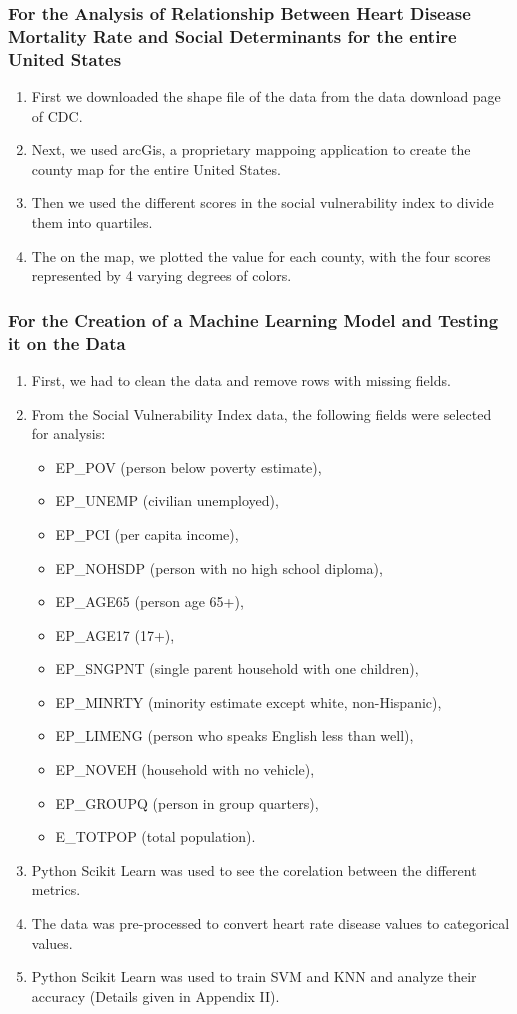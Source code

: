 \documentclass[journal,12pt,onecolumn]{IEEEtran}
\begin{document}
\subsubsection{For the Analysis of Relationship Between Heart Disease Mortality Rate and Social Determinants for the entire United States}
\begin{enumerate}
\item First we downloaded the shape file of the data from the data download page of CDC.
\item Next, we used arcGis, a proprietary mappoing application to create the county map for the entire United States.
\item Then we used the different scores in the social vulnerability index to divide them into quartiles.
\item The on the map, we plotted the value for each county, with the four scores represented by 4 varying degrees of colors.
\end{enumerate}

\subsubsection{For the Creation of a Machine Learning Model and Testing it on the Data}
\begin{enumerate}
\item First, we had to clean the data and remove rows with missing fields.
\item From the Social Vulnerability Index data, the following fields were selected for analysis: 
\begin{itemize}
\item EP\_POV (person below poverty estimate),
\item EP\_UNEMP (civilian unemployed),
\item EP\_PCI (per capita income),
\item EP\_NOHSDP (person with no high school diploma),
\item EP\_AGE65 (person age 65+),
\item EP\_AGE17 (17+),
\item EP\_SNGPNT (single parent household with one children),
\item EP\_MINRTY (minority estimate except white, non-Hispanic),
\item EP\_LIMENG (person who speaks English less than well),
\item EP\_NOVEH (household with no vehicle),
\item EP\_GROUPQ (person in group quarters),
\item E\_TOTPOP (total population).
\end{itemize}
\item Python Scikit Learn was used to see the corelation between the different metrics.
\item The data was pre-processed to convert heart rate disease values to categorical values.
\item Python Scikit Learn was used to train SVM and KNN and analyze their accuracy (Details given in Appendix II).  
\end{enumerate}
\end{document}
